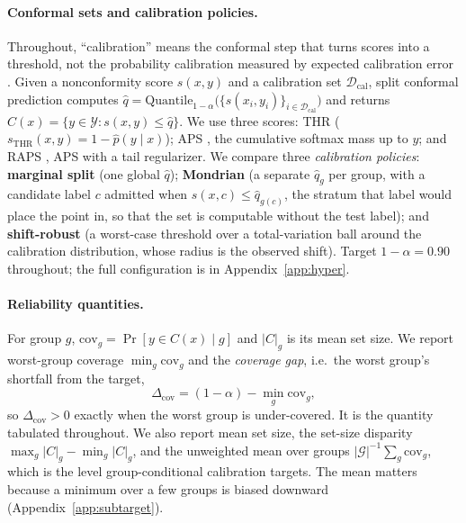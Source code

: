 \documentclass[pdflatex,sn-basic]{sn-jnl}%
\theoremstyle{thmstyleone}%
\newcommand{\cov}{\mathrm{cov}}
\newcommand{\covgap}{\Delta_{\cov}}
\begin{document}
\paragraph{Conformal sets and calibration policies.} Throughout, ``calibration''
means the conformal step that turns scores into a threshold, not the probability
calibration measured by expected calibration error \citep{guo2017calibration}. Given a nonconformity score
$s(x,y)$ and a calibration set $\mathcal{D}_{\mathrm{cal}}$, split conformal
prediction computes
$\hat q=\mathrm{Quantile}_{1-\alpha}\big(\{s(x_i,y_i)\}_{i\in\mathcal{D}_{\mathrm{cal}}}\big)$
and returns $C(x)=\{y\in\mathcal{Y}: s(x,y)\le\hat q\}$. We use three scores: THR
($s_{\mathrm{THR}}(x,y)=1-\hat p(y\mid x)$); APS \citep{romano2020}, the cumulative
softmax mass up to $y$; and RAPS \citep{angelopoulos2020}, APS with a tail
regularizer. We compare three \emph{calibration policies}: \textbf{marginal split}
(one global $\hat q$); \textbf{Mondrian} (a separate $\hat q_g$ per group, with a candidate label
$c$ admitted when $s(x,c)\le\hat q_{g(c)}$, the stratum that label would place the point in, so
that the set is computable without the test label); and
\textbf{shift-robust} (a worst-case threshold over a total-variation ball around the calibration
distribution, whose radius is the observed shift). Target $1-\alpha=0.90$ throughout; the full configuration is in
Appendix~\ref{app:hyper}.

\paragraph{Reliability quantities.} For group $g$, $\cov_g=\Pr[y\in C(x)\mid g]$
and $|C|_g$ is its mean set size. We report worst-group coverage $\min_g\cov_g$
and the \emph{coverage gap}, i.e.\ the worst group's shortfall from the target,
\begin{equation}
\covgap=(1-\alpha)-\min_g\cov_g,
\label{eq:covgap}
\end{equation}
so $\covgap>0$ exactly when the worst group is under-covered. It is the quantity tabulated
throughout. We also report mean set size, the set-size disparity
$\max_g|C|_g-\min_g|C|_g$, and the unweighted mean over groups
$|\mathcal{G}|^{-1}\sum_g\cov_g$, which is the level group-conditional calibration targets. The
mean matters because a minimum over a few groups is biased downward (Appendix~\ref{app:subtarget}).
\end{document}
